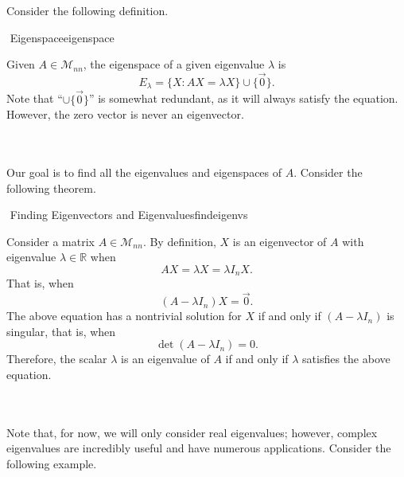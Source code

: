         Consider the following definition.
        \begin{definition}{\Stop\,\,Eigenspace}{eigenspace}

            Given \(A\in\mathcal{M}_{nn}\), the eigenspace of a given eigenvalue \(\lambda\) is
            \begin{equation*}
                E_\lambda=\{X:AX=\lambda X\}\cup\{\vec{0}\}.
            \end{equation*}
            Note that ``\(\cup \{\vec{0}\}\)'' is somewhat redundant, as it will always satisfy the equation. However, the zero vector is never an eigenvector.

        \end{definition}
        \vphantom
        \\
        \\
        Our goal is to find all the eigenvalues and eigenspaces of \(A\). Consider the following theorem.
        \begin{theorem}{\Stop\,\,Finding Eigenvectors and Eigenvalues}{findeigenvs}
    
            Consider a matrix \(A\in\mathcal{M}_{nn}\). By definition, \(X\) is an eigenvector of \(A\) with eigenvalue \(\lambda\in\mathbb{R}\) when
            \begin{equation*}
                AX=\lambda X=\lambda I_nX.
            \end{equation*}
            That is, when
            \begin{equation*}
                (A-\lambda I_n)X=\vec{0}.
            \end{equation*}
            The above equation has a nontrivial solution for \(X\) if and only if \((A-\lambda I_n)\) is singular, that is, when
            \begin{equation*}
                \det(A-\lambda I_n)=0.
            \end{equation*}
            Therefore, the scalar \(\lambda\) is an eigenvalue of \(A\) if and only if \(\lambda\) satisfies the above equation.
        \end{theorem}
        \pagebreak
        \vphantom
        \\
        \\
        Note that, for now, we will only consider real eigenvalues; however, complex eigenvalues are incredibly useful and have numerous applications. Consider the following example.
